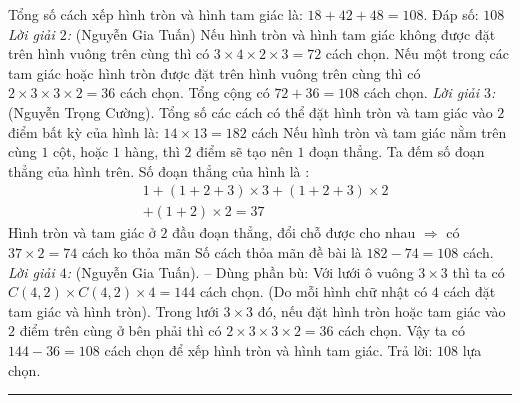 \begin{multicols}{2}
\vskip 0.1cm
Tổng số cách xếp hình tròn và hình tam giác là: $18 + 42 + 48 = 108$.
\vskip 0.1cm
Đáp số: $108$
\vskip 0.1cm
\textit{Lời giải $2$:} (Nguyễn Gia Tuấn)
\vskip 0.1cm
Nếu hình tròn và hình tam giác không được đặt trên hình vuông trên cùng thì có $3 \times 4 \times 2 \times 3 = 72$ cách chọn.
\vskip 0.1cm
Nếu một trong các tam giác hoặc hình tròn được đặt trên hình vuông trên cùng thì có $2 \times 3 \times 3 \times 2 = 36$ cách chọn.
\vskip 0.1cm
Tổng cộng có $72 + 36 = 108$ cách chọn.
\vskip 0.1cm
\textit{Lời giải $3$:} (Nguyễn Trọng Cường).
\vskip 0.1cm
Tổng số các cách có thể đặt hình tròn và tam giác vào $2$ điểm bất kỳ của hình là: $14\times13 = 182$ cách
\vskip 0.1cm
Nếu hình tròn và tam giác nằm trên cùng $1$ cột, hoặc $1$ hàng, thì $2$ điểm sẽ tạo nên $1$ đoạn thẳng. Ta đếm số đoạn thẳng của hình trên.
\vskip 0.1cm
Số đoạn thẳng của hình là :
\begin{align*}
		&1 + (1+2+3) \times 3 + (1+2+3) \times 2 \\
		&+ (1+2) \times 2 = 37
	\end{align*}
Hình tròn và tam giác ở $2$ đầu đoạn thẳng, đổi chỗ được cho nhau $\Rightarrow$ có $37 \times 2 = 74$ cách ko thỏa mãn
\vskip 0.1cm
Số cách thỏa mãn đề bài là $182 - 74 = 108$ cách.
\vskip 0.1cm
\textit{Lời giải $4$:} (Nguyễn Gia Tuấn). -- Dùng phần bù:
\vskip 0.1cm
Với lưới ô vuông $3 \times 3$ thì ta có $C(4,2)\times C(4,2)\times 4 = 144$ cách chọn. (Do mỗi hình chữ nhật có $4$ cách đặt tam giác và hình tròn).
\vskip 0.1cm
Trong lưới $3 \times 3$ đó, nếu đặt hình tròn hoặc tam giác vào $2$ điểm trên cùng ở bên phải thì có $2 \times 3 \times  3 \times 2 = 36$ cách chọn.
\vskip 0.1cm
Vậy ta có $144 - 36 = 108$ cách chọn để xếp hình tròn và hình tam giác.
\vskip 0.1cm
Trả lời: $108$ lựa chọn.	
\end{multicols}
\vspace*{-10pt}
\rule{1\linewidth}{0.1pt}
\begingroup
